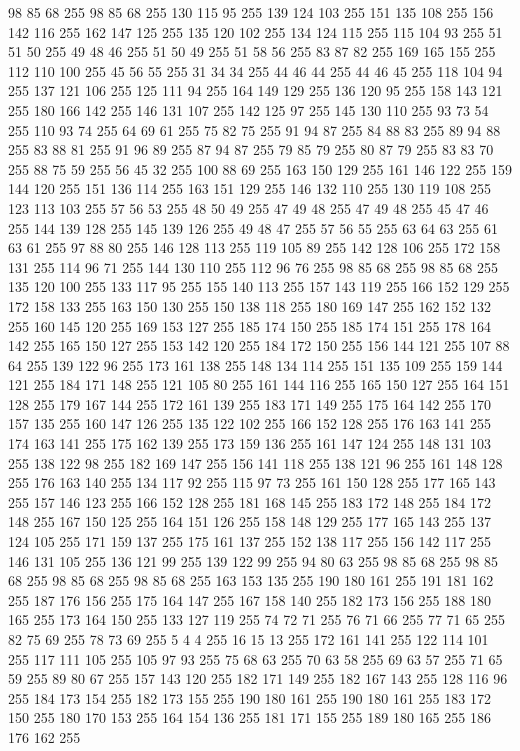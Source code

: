 98 85 68 255 98 85 68 255 130 115 95 255 139 124 103 255 151 135 108 255 156 142 116 255 162 147 125 255 135 120 102 255 134 124 115 255 115 104 93 255 51 51 50 255 49 48 46 255 51 50 49 255 51 58 56 255 83 87 82 255 169 165 155 255 112 110 100 255 45 56 55 255 31 34 34 255 44 46 44 255 44 46 45 255 118 104 94 255 137 121 106 255 125 111 94 255 164 149 129 255 136 120 95 255 158 143 121 255 180 166 142 255 146 131 107 255 142 125 97 255 145 130 110 255 93 73 54 255 110 93 74 255 64 69 61 255 75 82 75 255 91 94 87 255 84 88 83 255 89 94 88 255 83 88 81 255 91 96 89 255 87 94 87 255 79 85 79 255 80 87 79 255 83 83 70 255 88 75 59 255 56 45 32 255 100 88 69 255 163 150 129 255 161 146 122 255 159 144 120 255 151 136 114 255 163 151 129 255 146 132 110 255 130 119 108 255 123 113 103 255 57 56 53 255 48 50 49 255 47 49 48 255 47 49 48 255 45 47 46 255 144 139 128 255 145 139 126 255 49 48 47 255 57 56 55 255
63 64 63 255 61 63 61 255 97 88 80 255 146 128 113 255 119 105 89 255 142 128 106 255 172 158 131 255 114 96 71 255 144 130 110 255 112 96 76 255 98 85 68 255 98 85 68 255 135 120 100 255 133 117 95 255 155 140 113 255 157 143 119 255 166 152 129 255 172 158 133 255 163 150 130 255 150 138 118 255 180 169 147 255 162 152 132 255 160 145 120 255 169 153 127 255 185 174 150 255 185 174 151 255 178 164 142 255 165 150 127 255 153 142 120 255 184 172 150 255 156 144 121 255 107 88 64 255 139 122 96 255 173 161 138 255 148 134 114 255 151 135 109 255 159 144 121 255 184 171 148 255 121 105 80 255 161 144 116 255 165 150 127 255 164 151 128 255 179 167 144 255 172 161 139 255 183 171 149 255 175 164 142 255 170 157 135 255 160 147 126 255 135 122 102 255 166 152 128 255 176 163 141 255 174 163 141 255 175 162 139 255 173 159 136 255 161 147 124 255 148 131 103 255 138 122 98 255 182 169 147 255 156 141 118 255 138 121 96 255 161 148 128 255 176 163 140 255 134 117 92 255 115 97 73 255
161 150 128 255 177 165 143 255 157 146 123 255 166 152 128 255 181 168 145 255 183 172 148 255 184 172 148 255 167 150 125 255 164 151 126 255 158 148 129 255 177 165 143 255 137 124 105 255 171 159 137 255 175 161 137 255 152 138 117 255 156 142 117 255 146 131 105 255 136 121 99 255 139 122 99 255 94 80 63 255 98 85 68 255 98 85 68 255 98 85 68 255 98 85 68 255 163 153 135 255 190 180 161 255 191 181 162 255 187 176 156 255 175 164 147 255 167 158 140 255 182 173 156 255 188 180 165 255 173 164 150 255 133 127 119 255 74 72 71 255 76 71 66 255 77 71 65 255 82 75 69 255 78 73 69 255 5 4 4 255 16 15 13 255 172 161 141 255 122 114 101 255 117 111 105 255 105 97 93 255 75 68 63 255 70 63 58 255 69 63 57 255 71 65 59 255 89 80 67 255 157 143 120 255 182 171 149 255 182 167 143 255 128 116 96 255 184 173 154 255 182 173 155 255 190 180 161 255 190 180 161 255 183 172 150 255 180 170 153 255 164 154 136 255 181 171 155 255 189 180 165 255 186 176 162 255
